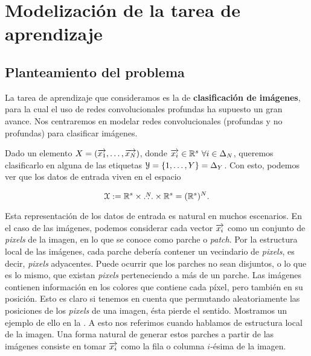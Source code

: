 \chapter{Modelización de la tarea de aprendizaje} \label{ch:tarea_aprendizaje}

\section{Planteamiento del problema} \label{seq:planteamiento_problema}

La tarea de aprendizaje que consideramos es la de \textbf{clasificación de imágenes}, para la cual el uso de redes convolucionales profundas ha supuesto un gran avance. Nos centraremos en modelar redes convolucionales (profundas y no profundas) para clasificar imágenes.

Dado un elemento $X = (\overrightarrow{x_1}, \ldots, \overrightarrow{x_N})$, donde $\nv{x_i} \in \R^s \ \forall i \in \deltaset{N}$, queremos clasificarlo en alguna de las etiquetas $\mathcal{Y} = \{1, \ldots, Y \} = \Delta_{Y}$. Con esto, podemos ver que los datos de entrada viven en el espacio

\begin{equation}
	\mathcal{X} := \mathbb{R}^s \times \overset{N}{\ldots} \times \mathbb{R}^s = (\mathbb{R}^s)^N.
\end{equation}

Esta representación de los datos de entrada es natural en muchos escenarios. En el caso de las imágenes, podemos considerar cada vector $\overrightarrow{x_i}$ como un conjunto de \textit{pixels} de la imagen, en lo que se conoce como parche o \textit{patch}. Por la estructura local de las imágenes, cada parche debería contener un vecindario de \textit{pixels}, es decir, \textit{pixels} adyacentes. Puede ocurrir que los parches no sean disjuntos, o lo que es lo mismo, que existan \textit{pixels} perteneciendo a más de un parche. Las imágenes contienen información en los colores que contiene cada píxel, pero también en su posición. Esto es claro si tenemos en cuenta que permutando aleatoriamente las posiciones de los \textit{pixels} de una imagen, ésta pierde el sentido. Mostramos un ejemplo de ello en la . A esto nos referimos cuando hablamos de estructura local de la imagen. Una forma natural de generar estos parches a partir de las imágenes consiste en tomar $\overrightarrow{x_i}$ como la fila o columna $i$-ésima de la imagen.

